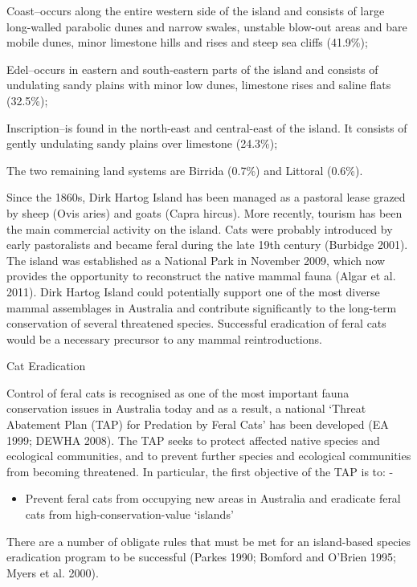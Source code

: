 \documentclass[version=last,
    paper=a4,                               %
    10pt,                                   %
    dvipsnames,
    oneside,                              %
    headings=openany,                       %
    open=any,
    BCOR=7mm,                               %
    DIV=15,     %
]{scrbook}
\begin{document}
Coast--occurs along the entire western side of the island and consists
of large long-walled parabolic dunes and narrow swales, unstable
blow-out areas and bare mobile dunes, minor limestone hills and rises
and steep sea cliffs (41.9\%);

Edel--occurs in eastern and south-eastern parts of the island and
consists of undulating sandy plains with minor low dunes, limestone
rises and saline flats (32.5\%);

Inscription--is found in the north-east and central-east of the island.
It consists of gently undulating sandy plains over limestone (24.3\%);

The two remaining land systems are Birrida (0.7\%) and Littoral (0.6\%).

Since the 1860s, Dirk Hartog Island has been managed as a pastoral lease
grazed by sheep (Ovis aries) and goats (Capra hircus). More recently,
tourism has been the main commercial activity on the island. Cats were
probably introduced by early pastoralists and became feral during the
late 19th century (Burbidge 2001). The island was established as a
National Park in November 2009, which now provides the opportunity to
reconstruct the native mammal fauna (Algar et al. 2011). Dirk Hartog
Island could potentially support one of the most diverse mammal
assemblages in Australia and contribute significantly to the long-term
conservation of several threatened species. Successful eradication of
feral cats would be a necessary precursor to any mammal reintroductions.

Cat Eradication

Control of feral cats is recognised as one of the most important fauna
conservation issues in Australia today and as a result, a national
`Threat Abatement Plan (TAP) for Predation by Feral Cats' has been
developed (EA 1999; DEWHA 2008). The TAP seeks to protect affected
native species and ecological communities, and to prevent further
species and ecological communities from becoming threatened. In
particular, the first objective of the TAP is to: -

\begin{itemize}
\itemsep1pt\parskip0pt
\item
  Prevent feral cats from occupying new areas in Australia and eradicate
  feral cats from high-conservation-value `islands'
\end{itemize}

There are a number of obligate rules that must be met for an
island-based species eradication program to be successful (Parkes 1990;
Bomford and O'Brien 1995; Myers et al. 2000).
\end{document}
